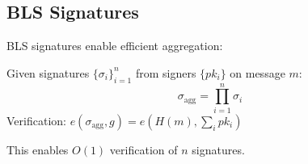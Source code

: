 \subsection{BLS Signatures}

BLS signatures enable efficient aggregation:

\begin{definition}
Given signatures $\{\sigma_i\}_{i=1}^n$ from signers $\{pk_i\}$ on message $m$:
\begin{equation}
\sigma_{\text{agg}} = \prod_{i=1}^n \sigma_i
\end{equation}
Verification: $e(\sigma_{\text{agg}}, g) = e(H(m), \sum_i pk_i)$
\end{definition}

This enables $O(1)$ verification of $n$ signatures.

